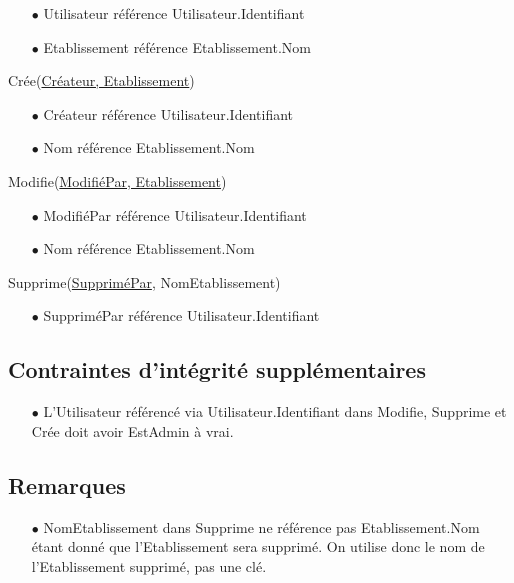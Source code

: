 \documentclass[a4paper, 11pt]{article}
\begin{document}
\begin{itemize}
	\item[$\bullet$] Utilisateur référence Utilisateur.Identifiant
	\item[$\bullet$] Etablissement référence Etablissement.Nom
\end{itemize}
Crée(\underline{Créateur, Etablissement})
\begin{itemize}
	\item[$\bullet$] Créateur référence Utilisateur.Identifiant
	\item[$\bullet$] Nom référence Etablissement.Nom
\end{itemize}
Modifie(\underline{ModifiéPar, Etablissement})
\begin{itemize}
	\item[$\bullet$] ModifiéPar référence Utilisateur.Identifiant
	\item[$\bullet$] Nom référence Etablissement.Nom
\end{itemize}
Supprime({\underline{SuppriméPar}, NomEtablissement})
\begin{itemize}
	\item[$\bullet$] SuppriméPar référence Utilisateur.Identifiant
\end{itemize}
\subsection*{Contraintes d'intégrité supplémentaires}
\begin{itemize}
	\item[$\bullet$] L'Utilisateur référencé via Utilisateur.Identifiant dans Modifie, Supprime et Crée doit avoir EstAdmin à vrai.
\end{itemize}


\subsection*{Remarques}
\begin{itemize}
	\item[$\bullet$] NomEtablissement dans Supprime ne référence pas Etablissement.Nom étant donné que l'Etablissement sera supprimé. On utilise donc le nom de l'Etablissement supprimé, pas une clé.
\end{itemize}
\end{document}
